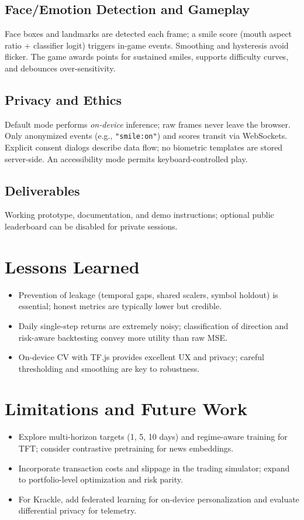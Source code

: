 \documentclass[11pt]{article}
\begin{document}
\subsection{Face/Emotion Detection and Gameplay}
Face boxes and landmarks are detected each frame; a smile score (mouth aspect ratio + classifier logit) triggers in-game events. Smoothing and hysteresis avoid flicker. The game awards points for sustained smiles, supports difficulty curves, and debounces over-sensitivity.

\subsection{Privacy and Ethics}
Default mode performs \emph{on-device} inference; raw frames never leave the browser. Only anonymized events (e.g., \texttt{"smile:on"}) and scores transit via WebSockets. Explicit consent dialogs describe data flow; no biometric templates are stored server-side. An accessibility mode permits keyboard-controlled play.

\subsection{Deliverables}
Working prototype, documentation, and demo instructions; optional public leaderboard can be disabled for private sessions.

\section{Lessons Learned}
\begin{itemize}[leftmargin=*]
  \item Prevention of leakage (temporal gaps, shared scalers, symbol holdout) is essential; honest metrics are typically lower but credible.
  \item Daily single-step returns are extremely noisy; classification of direction and risk-aware backtesting convey more utility than raw MSE.
  \item On-device CV with TF.js provides excellent UX and privacy; careful thresholding and smoothing are key to robustness.
\end{itemize}

\section{Limitations and Future Work}
\begin{itemize}[leftmargin=*]
  \item Explore multi-horizon targets (1, 5, 10 days) and regime-aware training for TFT; consider contrastive pretraining for news embeddings.
  \item Incorporate transaction costs and slippage in the trading simulator; expand to portfolio-level optimization and risk parity.
  \item For Krackle, add federated learning for on-device personalization and evaluate differential privacy for telemetry.
\end{itemize}
\end{document}
